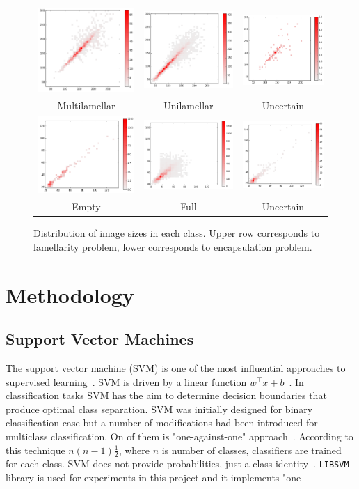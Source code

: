 \documentclass[a4paper, 11pt, table]{article}
\begin{document}
\begin{landscape}
\begin{figure}
\centering
\begin{tabular}{ccc}
 \includegraphics[scale=0.4]{img_size/lamellarity/heatmap_multilamellar.png} & \includegraphics[scale=0.4]{img_size/lamellarity/heatmap_unilamellar.png} & \includegraphics[scale=0.4]{img_size/lamellarity/heatmap_uncertain.png} \\
	Multilamellar & Unilamellar & Uncertain \\[6pt]
	\includegraphics[scale=0.4]{img_size/encapsulation/heatmap_empty.png} & \includegraphics[scale=0.4]{img_size/encapsulation/heatmap_full.png} & \includegraphics[scale=0.4]{img_size/encapsulation/heatmap_uncertain.png} \\
	Empty & Full & Uncertain \\[6pt]
\end{tabular}
\caption{Distribution of image sizes in each class. Upper row corresponds to lamellarity problem, lower corresponds to encapsulation problem.}
\label{fig:img_size_per_class}
\end{figure}
\end{landscape}


\section{Methodology}

\subsection{Support Vector Machines}
\label{sec:svm}
The support vector machine (SVM) is one of the most influential approaches to supervised learning~\cite{Boser:1992:TAO:130385.130401}. SVM is driven by a linear function $w^\top x + b$~\cite{dl_book}. In classification tasks SVM has the aim to determine decision boundaries that produce optimal class separation. SVM was initially designed for binary classification case but a number of modifications had been introduced for multiclass classification. On of them is "one-against-one" approach~\cite{Knerr1990}. According to this technique $n (n-1)\frac{1}{2}$, where $n$ is number of classes, classifiers are trained for each class. SVM does not provide probabilities, just a class identity~\cite{dl_book}. \texttt{LIBSVM}~\cite{CC01a} library is used for experiments in this project and it implements "one
\end{document}
